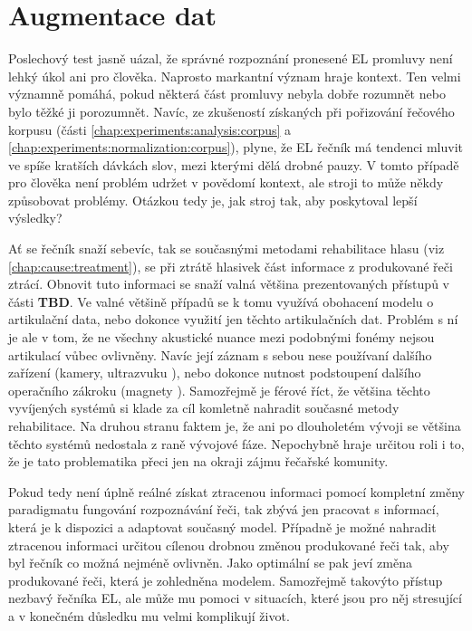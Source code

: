 \section{Augmentace dat}
\label{chap:realisation:augmentation}

Poslechový test jasně uázal, že správné rozpoznání pronesené EL promluvy není lehký úkol ani pro člověka. Naprosto markantní význam hraje kontext. Ten velmi významně pomáhá, pokud některá část promluvy nebyla dobře rozumnět nebo bylo těžké ji porozumnět. Navíc, ze zkušeností získaných při pořizování řečového korpusu (části \ref{chap:experiments:analysis:corpus} a \ref{chap:experiments:normalization:corpus}), plyne, že EL řečník má tendenci mluvit ve spíše kratších dávkách slov, mezi kterými dělá drobné pauzy. V tomto případě pro člověka není problém udržet v povědomí kontext, ale stroji to může někdy způsobovat problémy. Otázkou tedy je, jak  stroj tak, aby poskytoval lepší výsledky?

Ať se řečník snaží sebevíc, tak se současnými metodami rehabilitace hlasu (viz \ref{chap:cause:treatment}), se při ztrátě hlasivek část informace z produkované řeči ztrácí. Obnovit tuto informaci se snaží valná většina prezentovaných přístupů v části \textbf{TBD}. Ve valné většině případů se k tomu využívá obohacení modelu o artikulační data, nebo dokonce využití jen těchto artikulačních dat. \cite{Denby2010} \cite{Hofe2013} Problém s ní je ale v tom, že ne všechny akustické nuance mezi podobnými fonémy nejsou artikulací vůbec ovlivněny. Navíc její záznam s sebou nese používaní dalšího zařízení (kamery, ultrazvuku \cite{Hueber2010}), nebo dokonce nutnost podstoupení dalšího operačního zákroku (magnety \cite{Hofe2011}). Samozřejmě je férové říct, že většina těchto vyvíjených systémů si klade za cíl komletně nahradit současné metody rehabilitace. Na druhou stranu faktem je, že ani po dlouholetém vývoji se většina těchto systémů nedostala z raně vývojové fáze. Nepochybně hraje určitou roli i to, že je tato problematika přeci jen na okraji zájmu řečařské komunity.

Pokud tedy není úplně reálné získat ztracenou informaci pomocí kompletní změny paradigmatu fungování rozpoznávání řeči, tak zbývá jen pracovat s informací, která je k dispozici a adaptovat současný model. Případně je možné nahradit ztracenou informaci určitou cílenou drobnou změnou produkované řeči tak, aby byl řečník co možná nejméně ovlivněn. Jako optimální se pak jeví změna produkované řeči, která je zohledněna modelem. Samozřejmě takovýto přístup nezbavý řečníka EL, ale může mu pomoci v situacích, které jsou pro něj stresující a v konečném důsledku mu velmi komplikují život.

